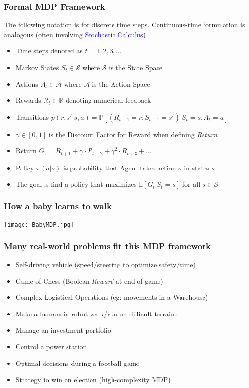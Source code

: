 \documentclass[handout]{beamer}
\begin{document}
\begin{frame}
\frametitle{Formal MDP Framework}
The following notation is for discrete time steps. Continuous-time formulation is analogous (often involving
\href{https://github.com/coverdrive/technical-documents/blob/master/finance/cme241/StochasticCalculusFoundations.pdf}{\underline{\textcolor{blue}{Stochastic Calculus}}})
\pause
\begin{itemize}[<+->]
\item Time steps denoted as $t = 1, 2, 3, \ldots$
\item Markov States $S_t \in \mathcal{S}$ where $\mathcal{S}$ is the State Space
\item Actions $A_t \in \mathcal{A}$ where $\mathcal{A}$ is the Action Space
\item Rewards $R_t \in \mathbb{R}$ denoting numerical feedback\
\item Transitions $p(r,s'|s,a) = \mathbb{P}[(R_{t+1}=r,S_{t+1}=s')|S_t=s,A_t=a]$
\item $\gamma \in [0,1]$ is the Discount Factor for Reward when defining {\em Return}
\item Return $G_t = R_{t+1} + \gamma \cdot R_{t+2} + \gamma^2 \cdot R_{t+3} + \ldots$
\item Policy $\pi(a|s)$ is probability that Agent takes action $a$ in states $s$
\item The goal is find a policy that maximizes  $\mathbb{E}[G_t|S_t = s]$ for all $s \in \mathcal{S}$
\end{itemize}
\end{frame}

\begin{frame}
\frametitle{How a baby learns to walk}
\texttt{[image: BabyMDP.jpg]}
\end{frame}

\begin{frame}
\frametitle{Many real-world problems fit this MDP framework}
\pause
\begin{itemize}[<+->]
\item Self-driving vehicle (speed/steering to optimize safety/time)
\item Game of Chess (Boolean {\em Reward} at end of game)
\item Complex Logistical Operations (eg: movements in a Warehouse)
\item Make a humanoid robot walk/run on difficult terrains
\item Manage an investment portfolio
\item Control a power station
\item Optimal decisions during a football game
\item Strategy to win an election (high-complexity MDP)
\end{itemize}
\end{frame}
\end{document}
